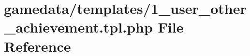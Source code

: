 \hypertarget{1__user__other__achievement_8tpl_8php}{\section{gamedata/templates/1\+\_\+user\+\_\+other\+\_\+achievement.tpl.\+php File Reference}
\label{1__user__other__achievement_8tpl_8php}
}

